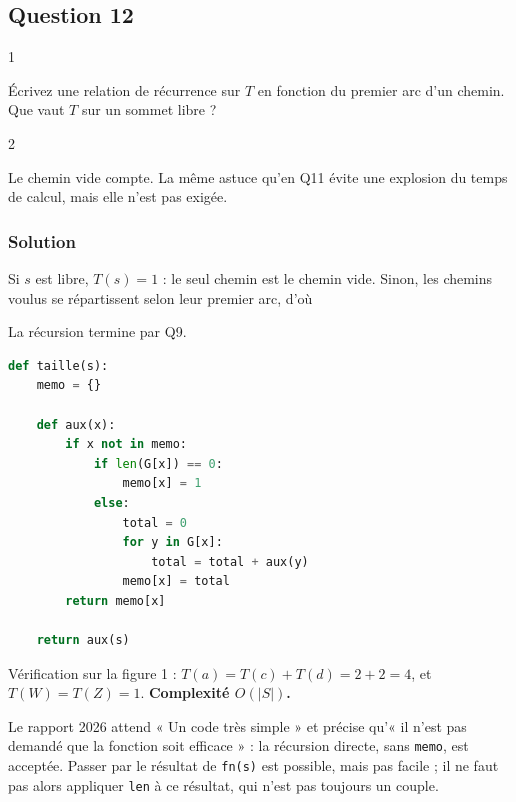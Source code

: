 \documentclass[11pt,a4paper]{article}
\newcommand{\equationajustee}[1]{%
  \sbox{\boiteequation}{$\displaystyle #1$}%
  \ifdim\wd\boiteequation>\linewidth
    \[\resizebox{\linewidth}{!}{\usebox{\boiteequation}}\]%
  \else
    \[#1\]%
  \fi}
\begin{document}
\hypertarget{question-12}{%
\subsection{Question 12}\label{question-12}}

\begin{indication}{1}

Écrivez une relation de récurrence sur \(T\) en fonction du premier arc d'un chemin. Que vaut \(T\) sur un sommet libre ?

\end{indication}

\begin{indication}{2}

Le chemin vide compte. La même astuce qu'en Q11 évite une explosion du temps de calcul, mais elle n'est pas exigée.

\end{indication}

\hypertarget{solution-11}{%
\subsubsection{Solution}\label{solution-11}}

Si \(s\) est libre, \(T(s)=1\) : le seul chemin est le chemin vide. Sinon, les chemins voulus se répartissent selon leur premier arc, d'où

\equationajustee{T(s)=\sum_{s\to t}T(t).}

La récursion termine par Q9.

\begin{lstlisting}[language=Python]
def taille(s):
    memo = {}

    def aux(x):
        if x not in memo:
            if len(G[x]) == 0:
                memo[x] = 1
            else:
                total = 0
                for y in G[x]:
                    total = total + aux(y)
                memo[x] = total
        return memo[x]

    return aux(s)
\end{lstlisting}

Vérification sur la figure 1 : \(T(a)=T(c)+T(d)=2+2=4\), et \(T(W)=T(Z)=1\). \textbf{Complexité \(O(|S|)\).}

\begin{jury}

Le rapport 2026 attend « Un code très simple » et précise qu'« il n'est pas demandé que la fonction soit efficace » : la récursion directe, sans \texttt{memo}, est acceptée. Passer par le résultat de \texttt{fn(s)} est possible, mais pas facile ; il ne faut pas alors appliquer \texttt{len} à ce résultat, qui n'est pas toujours un couple.

\end{jury}
\end{document}

